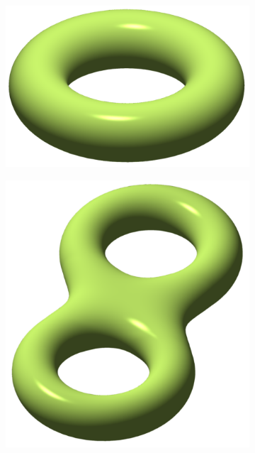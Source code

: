 \begin{figure}
\centering
\begin{subfigure}[b]{0.3\linewidth}
\includegraphics[width=\linewidth]{figs/genus1}
\caption{}%
\label{subfig:genus1}
\end{subfigure}
\quad
\begin{subfigure}[b]{0.3\linewidth}
\includegraphics[width=\linewidth]{figs/genus2}
\caption{}%
\label{subfig:genus2}
\end{subfigure}

\end{figure}
